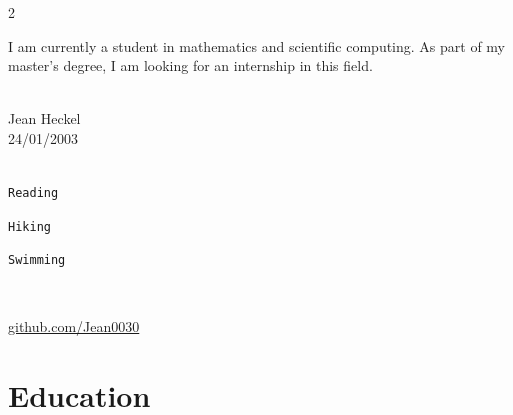 \documentclass[lighthipster]{simplehipstercv}
\begin{document}
\begin{paracol}{2}

\paracolbackgroundoptions



\footnotesize
{\setasidefontcolour

\begin{center}
\end{center}

{\centering{}\par}\vspace{0.5em}

\flushright
{\footnotesize
I am currently a student in mathematics and scientific computing. As part of my master's degree, I am looking for an internship in this field.}
\bigskip

\center
{} \\[0.5em]

Jean Heckel\\
24/01/2003

\bigskip


\\[0.5em]


\texttt{Reading} 

\texttt{Hiking}

\texttt{Swimming}

\vspace{4em}

 \\[0.5em]

\begin{center}
     \quad
     {\href{https://github.com/Jean0030}{github.com/Jean0030}}
\end{center}

\phantom{turn the page}

\phantom{turn the page}
}
\switchcolumn

\small
\section*{Education}


\end{paracol}
\end{document}
